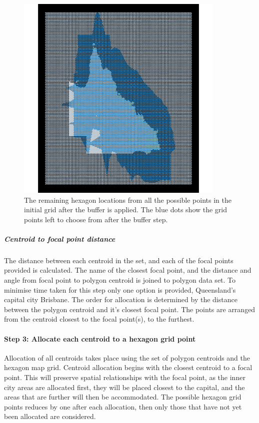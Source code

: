 \begin{figure}[h]
\centering
\includegraphics[width=10cm]{figures/3grid.pdf}
\caption{\label{fig:filter-grid}The remaining hexagon locations from all the possible points in the initial grid after the buffer is applied. The blue dots show the grid points left to choose from after the buffer step.}
\end{figure}

\hypertarget{centroid-to-focal-point-distance}{%
\subparagraph{Centroid to focal point
distance}\label{centroid-to-focal-point-distance}}

The distance between each centroid in the set, and each of the focal
points provided is calculated. The name of the closest focal point, and
the distance and angle from focal point to polygon centroid is joined to
polygon data set. To minimise time taken for this step only one option
is provided, Queensland's capital city Brisbane. The order for
allocation is determined by the distance between the polygon centroid
and it's closest focal point. The points are arranged from the centroid
closest to the focal point(s), to the furthest.

\hypertarget{step-3-allocate-each-centroid-to-a-hexagon-grid-point}{%
\paragraph{Step 3: Allocate each centroid to a hexagon grid
point}\label{step-3-allocate-each-centroid-to-a-hexagon-grid-point}}

Allocation of all centroids takes place using the set of polygon
centroids and the hexagon map grid. Centroid allocation begins with the
closest centroid to a focal point. This will preserve spatial
relationships with the focal point, as the inner city areas are
allocated first, they will be placed closest to the capital, and the
areas that are further will then be accommodated. The possible hexagon
grid points reduces by one after each allocation, then only those that
have not yet been allocated are considered.

